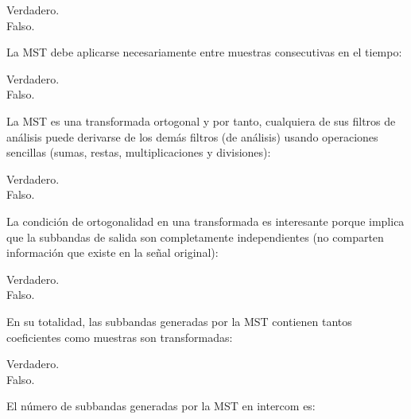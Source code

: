\documentclass[legalpaper, 12pt, addpoints]{exam}
\begin{document}
\begin{questions}
\begin{oneparchoices}
  \choice Verdadero.\\
  \choice Falso.
\end{oneparchoices}
  
\vspace{0.10in}

\question La MST debe aplicarse necesariamente entre muestras consecutivas en el tiempo:

\begin{oneparchoices}
  \choice Verdadero.\\
  \choice Falso.
\end{oneparchoices}
  
\vspace{0.10in}

\question La MST es una transformada ortogonal y por tanto, cualquiera
de sus filtros de análisis puede derivarse de los demás filtros (de
análisis) usando operaciones sencillas (sumas, restas,
multiplicaciones y divisiones):

\begin{oneparchoices}
  \choice Verdadero.\\
  \choice Falso.
\end{oneparchoices}
  
\vspace{0.10in}

\question La condición de ortogonalidad en una transformada es
interesante porque implica que la subbandas de salida son completamente
independientes (no comparten información que existe en la señal original):

\begin{oneparchoices}
  \choice Verdadero.\\
  \choice Falso.
\end{oneparchoices}
  
\vspace{0.10in}

\question En su totalidad, las subbandas generadas por la MST contienen tantos
coeficientes como muestras son transformadas:

\begin{oneparchoices}
  \choice Verdadero.\\
  \choice Falso.
\end{oneparchoices}
  
\vspace{0.10in}

\question El número de subbandas generadas por la MST en intercom es:


\end{questions}
\end{document}
